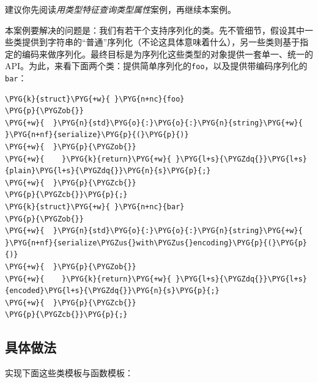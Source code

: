 
建议你先阅读\textit{用类型特征查询类型属性}案例，再继续本案例。



本案例要解决的问题是：我们有若干个支持序列化的类。先不管细节，假设其中一些类提供到字符串的“普通”序列化（不论这具体意味着什么），另一些类则基于指定的编码来做序列化。最终目标是为序列化这些类型的对象提供一套单一、统一的API。为此，来看下面两个类：提供简单序列化的\texttt{foo}，以及提供带编码序列化的\texttt{bar}：



\begin{codeblockbg}
\begin{Verbatim}[commandchars=\\\{\},breaklines=true,breakanywhere=true,fontsize=\codefont,xleftmargin=17bp]
\PYG{k}{struct}\PYG{+w}{ }\PYG{n+nc}{foo}
\PYG{p}{\PYGZob{}}
\PYG{+w}{  }\PYG{n}{std}\PYG{o}{:}\PYG{o}{:}\PYG{n}{string}\PYG{+w}{ }\PYG{n+nf}{serialize}\PYG{p}{(}\PYG{p}{)}
\PYG{+w}{  }\PYG{p}{\PYGZob{}}
\PYG{+w}{    }\PYG{k}{return}\PYG{+w}{ }\PYG{l+s}{\PYGZdq{}}\PYG{l+s}{plain}\PYG{l+s}{\PYGZdq{}}\PYG{n}{s}\PYG{p}{;}
\PYG{+w}{  }\PYG{p}{\PYGZcb{}}
\PYG{p}{\PYGZcb{}}\PYG{p}{;}
\PYG{k}{struct}\PYG{+w}{ }\PYG{n+nc}{bar}
\PYG{p}{\PYGZob{}}
\PYG{+w}{  }\PYG{n}{std}\PYG{o}{:}\PYG{o}{:}\PYG{n}{string}\PYG{+w}{ }\PYG{n+nf}{serialize\PYGZus{}with\PYGZus{}encoding}\PYG{p}{(}\PYG{p}{)}
\PYG{+w}{  }\PYG{p}{\PYGZob{}}
\PYG{+w}{    }\PYG{k}{return}\PYG{+w}{ }\PYG{l+s}{\PYGZdq{}}\PYG{l+s}{encoded}\PYG{l+s}{\PYGZdq{}}\PYG{n}{s}\PYG{p}{;}
\PYG{+w}{  }\PYG{p}{\PYGZcb{}}
\PYG{p}{\PYGZcb{}}\PYG{p}{;}
\end{Verbatim}
\end{codeblockbg}



\subsection{具体做法}



实现下面这些类模板与函数模板：




